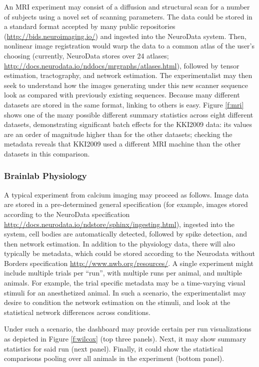An MRI experiment may consist of a diffusion and structural scan for a number of subjects using a novel set of scanning parameters.  The data could be stored in a standard format accepted by many public repositories (\url{http://bids.neuroimaging.io/}) and ingested into the NeuroData system.  Then, nonlinear image registration would warp the data to a common atlas of the user's choosing (currently, NeuroData stores over 24 atlases; \url{http://docs.neurodata.io/nddocs/mrgraphs/atlases.html}), followed by tensor estimation, tractography, and network estimation.  The experimentalist may then seek to understand how the images generating under this new scanner sequence look as compared with previously existing sequences. Because many different datasets are stored in the same format, linking to others is easy.  Figure \ref{f:mri} shows one of the many possible different summary statistics across eight different datasets, demonstrating significant batch effects for the KKI2009 data: its values are an order of magnitude higher than for the other datasets; checking the metadata reveals that KKI2009 used a different MRI machine than the other datasets in this comparison.


\subsubsection{Brainlab Physiology}

A typical experiment from calcium imaging may proceed as follows.  Image data are stored in a pre-determined general specification (for example, images stored according to the NeuroData specification \url{http://docs.neurodata.io/ndstore/sphinx/ingesting.html}), ingested into the system, cell bodies are automatically detected, followed by spike detection, and then network estimation.  In addition to the physiology data, there will also typically be metadata, which could be stored according to the Neurodata without Borders specification \url{http://www.nwb.org/resources/}. A single experiment might include multiple trials per ``run'', with multiple runs per animal, and multiple animals.  For example, the trial specific metadata may be a time-varying visual stimuli for an anesthetized animal. In such a scenario, the experimentalist may desire to condition the network estimation on the stimuli, and look at the statistical network differences across conditions.

Under such a scenario, the dashboard may provide certain per run visualizations as depicted in Figure \ref{f:wilcox} (top three panels). Next, it may show summary statistics for said run (next panel).  Finally, it could show the statistical comparisons pooling over all animals in the experiment (bottom panel).

